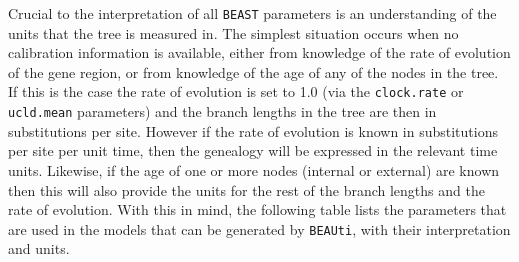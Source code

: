 \documentclass[cup7b, english]{cupbook}
\begin{document}
Crucial to the interpretation of all \texttt{BEAST} parameters is an understanding of
the units that the tree is measured in. The simplest situation occurs when no
calibration information is available, either from knowledge of the rate of
evolution of the gene region, or from knowledge of the age of any of the nodes
in the tree. If this is the case the rate of evolution is set to 1.0 (via the
\texttt{\small{clock.rate}} or \texttt{\small{ucld.mean}} parameters) and the
branch lengths in the tree are then in substitutions per site. However if the
rate of evolution is known in substitutions per site per unit time, then the
genealogy will be expressed in the relevant time units. Likewise, if the age
of one or more nodes (internal or external) are known then this will also
provide the units for the rest of the branch lengths and the rate of evolution.
With this in mind, the following table lists the parameters that are used in
the models that can be generated by \texttt{BEAUti}, with their interpretation and units.
\end{document}

